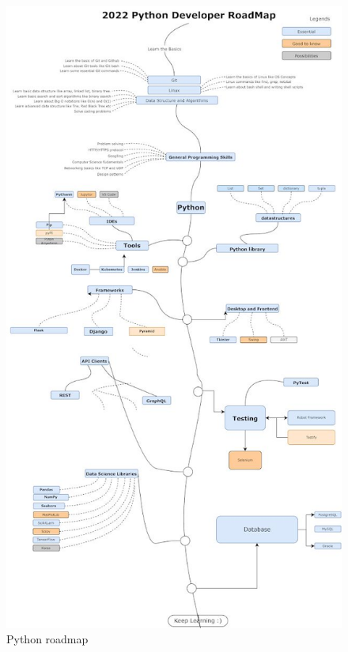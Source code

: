 \documentclass[12pt]{article}
\begin{document}
\begin{figure}[h!]
    \centering
    \includegraphics[width=\textwidth,height=0.97\textheight,keepaspectratio]{10-2-1}
    \caption{\small Python roadmap}
\end{figure}
\end{document}
